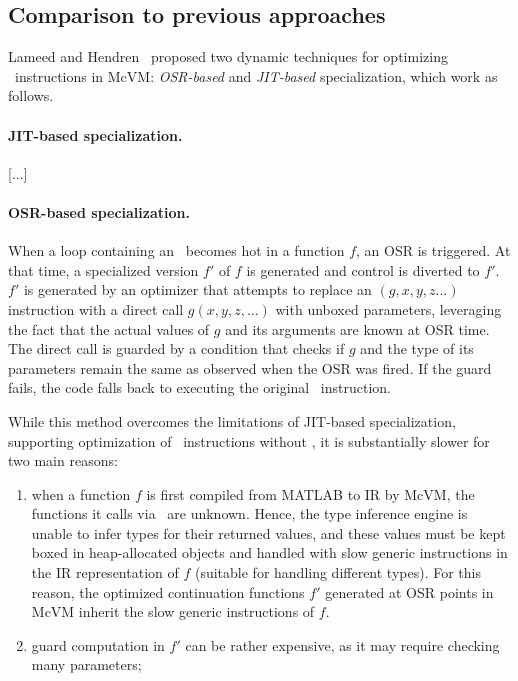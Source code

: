 \subsection{Comparison to previous approaches}

Lameed and Hendren~\cite{lameed2013feval} proposed two dynamic techniques for optimizing \feval\ instructions in McVM: {\em OSR-based} and {\em JIT-based} specialization, which work as follows.

\paragraph{JIT-based specialization.}  

[...]

\paragraph{OSR-based specialization.} When a loop containing an \feval\ becomes hot in a function $f$, an OSR is triggered. At that time, a specialized version $f'$ of $f$ is generated and control is diverted to $f'$. $f'$ is generated by an optimizer that attempts to replace an \feval$(g,x,y,z...)$ instruction with a direct call $g(x,y,z,...)$ with unboxed parameters, leveraging the fact that the actual values of $g$ and its arguments are known at OSR time. The direct call is guarded by a condition that checks if $g$ and the type of its parameters remain the same as observed when the OSR was fired. If the guard fails, the code falls back to executing the original \feval\ instruction.

While this method overcomes the limitations of JIT-based specialization, supporting optimization of \feval\ instructions without , it is substantially slower for two main reasons:
\begin{enumerate}
\item when a function $f$ is first compiled from MATLAB to IR by McVM, the functions it calls via \feval\ are unknown. Hence, the type inference engine is unable to infer types for their returned values, and these values must be kept boxed in heap-allocated objects and handled with slow generic instructions in the IR representation of $f$ (suitable for handling different types). For this reason, the optimized continuation functions $f'$ generated at OSR points in McVM inherit the slow generic instructions of $f$.
\item guard computation in $f'$ can be rather expensive, as it may require checking many parameters;
\end{enumerate}

